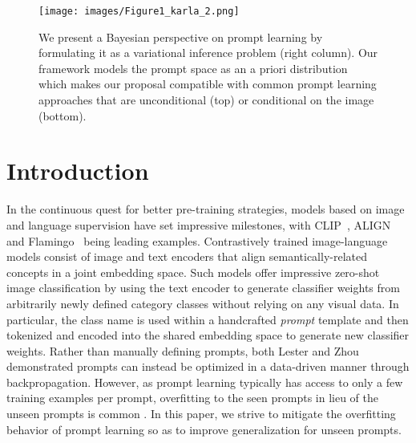 \documentclass[10pt,twocolumn,letterpaper]{article}
\begin{document}
\begin{figure}[t!]
\centering
\texttt{[image: images/Figure1\_karla\_2.png]}
\vspace{-2mm}
\caption{
 We present a Bayesian perspective on prompt learning by formulating it as a variational inference problem (right column). Our framework  models the prompt space as an a priori distribution which makes our proposal compatible with common prompt learning approaches that are unconditional (top) or conditional on the image (bottom).}
\vspace{-5mm}
\label{fig:splash}
\end{figure}

\vspace{-1em}
\section{Introduction}
\vspace{-0.5em}
\label{seq:intro}

In the continuous quest for better pre-training strategies, models based on image and language supervision have set impressive milestones, with CLIP~\cite{clip_icml21}, ALIGN~\cite{align_icml21} and Flamingo~\cite{flamingo_arxiv22} being leading examples. Contrastively trained image-language models consist of image and text encoders that align semantically-related concepts in a joint embedding space. Such models offer impressive zero-shot image classification by using the text encoder to generate classifier weights from arbitrarily newly defined category classes without relying on any visual data. In particular, the class name is used within a handcrafted \textit{prompt} template and then tokenized and encoded into the shared embedding space to generate new classifier weights. Rather than manually defining prompts, both Lester \etal \cite{lester2021power} and Zhou \etal \cite{zhou2022learning} demonstrated prompts can instead be optimized in a data-driven manner through backpropagation. However, as prompt learning typically has access to only a few training examples per prompt, overfitting to the seen prompts in lieu of the unseen prompts is common \cite{zhou2022learning}. In this paper, we strive to mitigate the overfitting behavior of prompt learning so as to improve generalization for unseen prompts.
\end{document}
